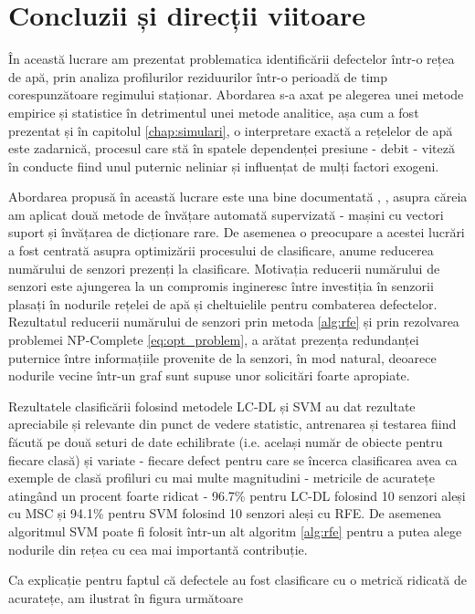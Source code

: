 \chapter{Concluzii și direcții viitoare}
\label{chap:conclusions}

În această lucrare am prezentat problematica identificării defectelor într-o rețea de apă, prin analiza profilurilor reziduurilor într-o perioadă de timp corespunzătoare regimului staționar. Abordarea s-a axat pe alegerea unei metode empirice și statistice în detrimentul unei metode analitice, așa cum a fost prezentat și în capitolul \ref{chap:simulari}, o interpretare exactă a rețelelor de apă este zadarnică, procesul care stă în spatele dependenței presiune - debit - viteză în conducte fiind unul puternic neliniar și influențat de mulți factori exogeni. 

Abordarea propusă în această lucrare este una bine documentată \cite{irofti2017dictionary}, \cite{perelman2016sensor}, \cite{rossman2000epanet} asupra căreia am aplicat două metode de învățare automată supervizată - mașini cu vectori suport și învățarea de dicționare rare. De asemenea o preocupare a acestei lucrări a fost centrată asupra optimizării procesului de clasificare, anume reducerea numărului de senzori prezenți la clasificare. Motivația reducerii numărului de senzori este ajungerea la un compromis ingineresc între investiția în senzorii plasați în nodurile rețelei de apă și cheltuielile pentru combaterea defectelor. Rezultatul reducerii numărului de senzori prin metoda \ref{alg:rfe} și prin rezolvarea problemei NP-Complete \ref{eq:opt_problem}, a arătat prezența redundanței puternice între informațiile provenite de la senzori, în mod natural, deoarece nodurile vecine într-un graf sunt supuse unor solicitări foarte apropiate.

Rezultatele clasificării folosind metodele LC-DL și SVM au dat rezultate apreciabile și relevante din punct de vedere statistic, antrenarea și testarea fiind făcută pe două seturi de date echilibrate (i.e. același număr de obiecte pentru fiecare clasă) și variate - fiecare defect pentru care se încerca clasificarea avea ca exemple de clasă profiluri cu mai multe magnitudini - metricile de acuratețe atingând un procent foarte ridicat - 96.7\% pentru LC-DL folosind 10 senzori aleși cu MSC și 94.1\% pentru SVM folosind 10 senzori aleși cu RFE. De asemenea algoritmul SVM poate fi folosit într-un alt algoritm \ref{alg:rfe} pentru a putea alege nodurile din rețea cu cea mai importantă contribuție.

Ca explicație pentru faptul că defectele au fost clasificare cu o metrică ridicată de acuratețe, am ilustrat în figura următoare 